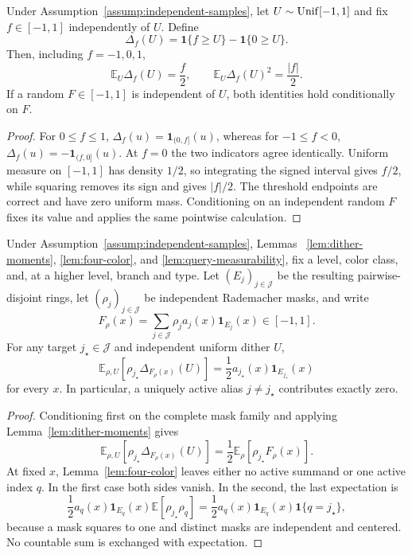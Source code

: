 \begin{lemma}\label{lem:dither-moments}
Under Assumption~\ref{assump:independent-samples}, let
$U\sim{\rm Unif}[-1,1]$ and fix $f\in[-1,1]$ independently of $U$.  Define
\[
 \Delta_f(U)=\mathbf1\{f\geq U\}-\mathbf1\{0\geq U\}.
\]
Then, including $f=-1,0,1$,
\[
 \mathbb E_U\Delta_f(U)=\frac f2,
 \qquad
 \mathbb E_U\Delta_f(U)^2=\frac{|f|}{2}.
\]
If a random $F\in[-1,1]$ is independent of $U$, both identities hold
conditionally on $F$.
\end{lemma}

\begin{proof}
For $0\leq f\leq1$,
$\Delta_f(u)=\mathbf1_{(0,f]}(u)$, whereas for $-1\leq f<0$,
$\Delta_f(u)=-\mathbf1_{(f,0]}(u)$.  At $f=0$ the two indicators agree
identically.  Uniform measure on $[-1,1]$ has density $1/2$, so integrating
the signed interval gives $f/2$, while squaring removes its sign and gives
$|f|/2$.  The threshold endpoints are correct and have zero uniform mass.
Conditioning on an independent random $F$ fixes its value and applies the
same pointwise calculation.
\end{proof}

\begin{lemma}
\label{lem:mask-projection}
Under Assumption~\ref{assump:independent-samples}, Lemmas~
\ref{lem:dither-moments}, \ref{lem:four-color}, and
\ref{lem:query-measurability}, fix a level, color class, and, at a higher
level, branch and type.  Let $(E_j)_{j\in\mathcal J}$ be the resulting
pairwise-disjoint rings, let $(\rho_j)_{j\in\mathcal J}$ be independent
Rademacher masks, and write
\[
 F_\rho(x)=\sum_{j\in\mathcal J}
 \rho_j a_j(x)\mathbf1_{E_j}(x)\in[-1,1].
\]
For any target $j_\star\in\mathcal J$ and independent uniform dither $U$,
\[
 \mathbb E_{\rho,U}\left[
 \rho_{j_\star}\Delta_{F_\rho(x)}(U)\right]
 =\frac12a_{j_\star}(x)\mathbf1_{E_{j_\star}}(x)
\]
for every $x$.  In particular, a uniquely active alias $j\neq j_\star$
contributes exactly zero.
\end{lemma}

\begin{proof}
Conditioning first on the complete mask family and applying
Lemma~\ref{lem:dither-moments} gives
\[
 \mathbb E_{\rho,U}
 [\rho_{j_\star}\Delta_{F_\rho(x)}(U)]
 =\frac12\mathbb E_\rho[\rho_{j_\star}F_\rho(x)].
\]
At fixed $x$, Lemma~\ref{lem:four-color} leaves either no active summand or
one active index $q$.  In the first case both sides vanish.  In the second,
the last expectation is
\[
 \frac12a_q(x)\mathbf1_{E_q}(x)
 \mathbb E[\rho_{j_\star}\rho_q]
 =\frac12a_q(x)\mathbf1_{E_q}(x)\mathbf1\{q=j_\star\},
\]
because a mask squares to one and distinct masks are independent and
centered.  No countable sum is exchanged with expectation.
\end{proof}

